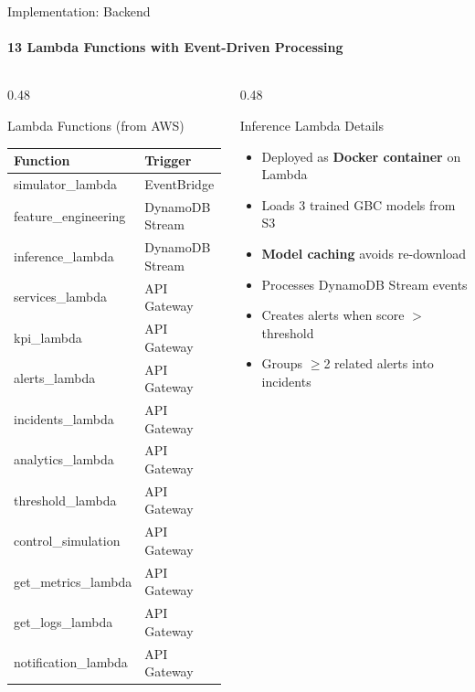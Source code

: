 \documentclass[aspectratio=169,11pt]{beamer}
\begin{document}
\begin{frame}[shrink=6]{Implementation: Backend}
\framesubtitle{13 Lambda Functions with Event-Driven Processing}

\vspace{-0.5em}
\begin{columns}[T]
\begin{column}{0.48\textwidth}
\begin{block}{Lambda Functions (from AWS)}
{\footnotesize
\begin{center}
\begin{tabular}{ll}
\toprule
\textbf{Function} & \textbf{Trigger} \\
\midrule
simulator\_lambda & EventBridge \\
feature\_engineering & DynamoDB Stream \\
inference\_lambda & DynamoDB Stream \\
\midrule
services\_lambda & API Gateway \\
kpi\_lambda & API Gateway \\
alerts\_lambda & API Gateway \\
incidents\_lambda & API Gateway \\
analytics\_lambda & API Gateway \\
threshold\_lambda & API Gateway \\
control\_simulation & API Gateway \\
get\_metrics\_lambda & API Gateway \\
get\_logs\_lambda & API Gateway \\
notification\_lambda & API Gateway\\
\bottomrule
\end{tabular}
\end{center}
}
\end{block}
\end{column}

\begin{column}{0.48\textwidth}
\begin{block}{Inference Lambda Details}
{\small
\begin{itemize}
    \item Deployed as \textbf{Docker container} on Lambda
    \item Loads 3 trained GBC models from S3
    \item \textbf{Model caching} avoids re-download
    \item Processes DynamoDB Stream events
    \item Creates alerts when score $>$ threshold
    \item Groups $\geq$2 related alerts into incidents
\end{itemize}
}
\end{block}


\end{column}
\end{columns}
\end{frame}
\end{document}
